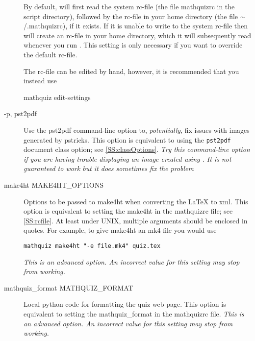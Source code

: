 \documentclass[svgnames]{article}
\newcommand\ddash{\texttt{\textemdash\textemdash}}
\newcommand\mathquizopt[1]{\textsf{mathquiz \ddash#1}}
\newcommand\mathquizrc{\index{mathquizrc}\textsf{mathquizrc}\xspace}
\newcommand\advancedOption{\textit{This is an advanced option. An incorrect value for this setting may stop \MathQuiz from working.}}
\begin{document}
\begin{description}
          By default, \MathQuiz will first read the system rc-file (the
          file \textsf{mathquizrc} in the \MathQuiz script directory),
          followed by the rc-file in your home directory (the file
          \textsf{$\sim$/.mathquizrc}), if it exists. If it is unable to
          write to the system rc-file then \MathQuiz will create an
          rc-file in your home directory, which it will subsequently
          read whenever you run \MathQuiz. This setting is only
          necessary if you want to override the default rc-file.

          The rc-file can be edited by hand, however, it is
          recommended that you instead use
          \begin{center}
            \mathquizopt{edit-settings}
          \end{center}
       \item[-p, \ddash pst2pdf] 
          Use the \textsf{pst2pdf} command-line option to, \textit{potentially},
          fix issues with images generated by pstricks.  This option is
          equivalent to using the \Verb|pst2pdf| document class option;
          see \autoref{SS:classOptions}.
          \newline
          \textit{Try this command-line option if you are having trouble
          displaying an image created using . It is not
          guaranteed to work but it does sometimes fix the problem}

       \item[\ddash make4ht MAKE4HT\_OPTIONS] 
          Options to be passed to \textsf{make4ht} when converting the \LaTeX{} to \textsf{xml}. This
          option is equivalent to setting the \textsf{make4ht}
          in the \mathquizrc file; see \autoref{SS:rcfile}. At least
          under UNIX, multiple arguments should be enclosed in quotes.
          For example, to give \textsf{make4ht} an mk4 file you would use
          \begin{center}
                    \texttt{mathquiz \ddash make4ht "-e file.mk4" quiz.tex}
          \end{center}

          \advancedOption

       \item[\ddash mathquiz\_format MATHQUIZ\_FORMAT] 
          Local python code for formatting the quiz web page. This
          option is equivalent to setting the \textsf{mathquiz\_format}
          in the \mathquizrc file.
          \advancedOption

    \end{description}
\end{document}
